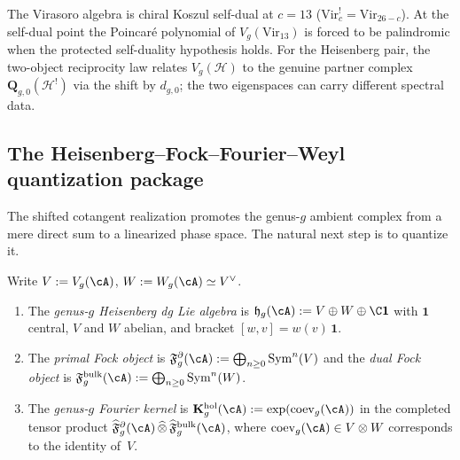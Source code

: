 \begin{remark}
\label{rem:holo-comp-palindromic-examples}
The Virasoro algebra is chiral Koszul self-dual at $c = 13$
($\mathrm{Vir}_c^! = \mathrm{Vir}_{26-c}$). At the self-dual
point the Poincar\'e polynomial of $V_g(\mathrm{Vir}_{13})$ is
forced to be palindromic when the protected self-duality hypothesis
holds. For the Heisenberg pair, the two-object reciprocity law relates
$V_g(\mathcal{H})$ to the genuine partner complex
$\mathbf Q_{g,0}(\mathcal H^!)$ via the shift by $d_{g,0}$;
the two eigenspaces can carry different spectral data.
\end{remark}

\subsection{The Heisenberg--Fock--Fourier--Weyl quantization package}
\label{subsec:holo-comp-quantization-package}

The shifted cotangent realization promotes the genus-$g$ ambient
complex from a mere direct sum to a linearized phase space. The
natural next step is to quantize it.

\begin{definition}
\label{def:holo-comp-heisenberg-fock}
Write $V := V_g(\cA)$, $W := W_g(\cA) \simeq V^\vee$.
\begin{enumerate}[label=\textup{(\roman*)}]
\item The \emph{genus-$g$ Heisenberg dg Lie algebra} is
 $\mathfrak{h}_g(\cA) := V \oplus W \oplus \C\mathbf{1}$
 with $\mathbf{1}$ central, $V$ and $W$ abelian, and bracket
 $[w, v] = w(v)\,\mathbf{1}$.
\item The \emph{primal Fock object} is
 $\mathfrak{F}^\partial_g(\cA) :=
 \bigoplus_{n \geq 0} \operatorname{Sym}^n(V)$
 and the \emph{dual Fock object} is
 $\mathfrak{F}^{\mathrm{bulk}}_g(\cA) :=
 \bigoplus_{n \geq 0} \operatorname{Sym}^n(W)$.
\item The \emph{genus-$g$ Fourier kernel} is
 $\mathbf{K}_g^{\mathrm{hol}}(\cA) :=
 \exp(\operatorname{coev}_g(\cA))$
 in the completed tensor product
 $\widehat{\mathfrak{F}}{}^\partial_g(\cA)
 \,\widehat{\otimes}\,
 \widehat{\mathfrak{F}}{}^{\mathrm{bulk}}_g(\cA)$,
 where
 $\operatorname{coev}_g(\cA) \in V \otimes W$ corresponds to the
 identity of~$V$.
\end{enumerate}
\end{definition}

